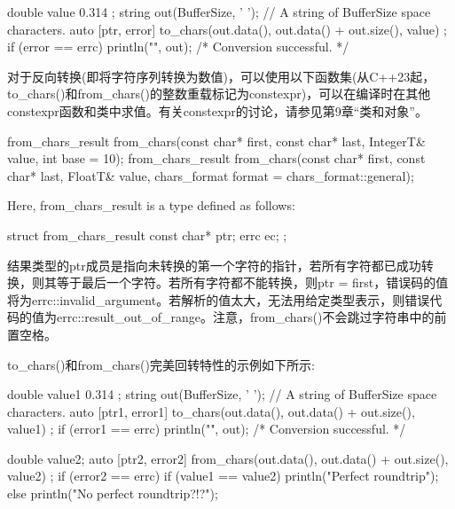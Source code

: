 \begin{cpp}
double value { 0.314 };
string out(BufferSize, ' '); // A string of BufferSize space characters.
auto [ptr, error] { to_chars(out.data(), out.data() + out.size(), value) };
if (error == errc{}) { println("{}", out); /* Conversion successful. */ }
\end{cpp}


对于反向转换(即将字符序列转换为数值)，可以使用以下函数集(从C++23起，to\_chars()和from\_chars()的整数重载标记为constexpr)，可以在编译时在其他constexpr函数和类中求值。有关constexpr的讨论，请参见第9章“类和对象”。

\begin{cpp}
from_chars_result from_chars(const char* first, const char* last, IntegerT& value,
                             int base = 10);
from_chars_result from_chars(const char* first, const char* last, FloatT& value,
                             chars_format format = chars_format::general);
\end{cpp}

Here, from\_chars\_result is a type defined as follows:

\begin{cpp}
struct from_chars_result {
    const char* ptr;
    errc ec;
};
\end{cpp}

结果类型的ptr成员是指向未转换的第一个字符的指针，若所有字符都已成功转换，则其等于最后一个字符。若所有字符都不能转换，则ptr = first，错误码的值将为errc::invalid\_argument。若解析的值太大，无法用给定类型表示，则错误代码的值为errc::result\_out\_of\_range。注意，from\_chars()不会跳过字符串中的前置空格。

to\_chars()和from\_chars()完美回转特性的示例如下所示:

\begin{cpp}
double value1 { 0.314 };
string out(BufferSize, ' '); // A string of BufferSize space characters.
auto [ptr1, error1] { to_chars(out.data(), out.data() + out.size(), value1) };
if (error1 == errc{}) { println("{}", out); /* Conversion successful. */ }

double value2;
auto [ptr2, error2] { from_chars(out.data(), out.data() + out.size(), value2) };
if (error2 == errc{}) {
    if (value1 == value2) {
        println("Perfect roundtrip");
    } else {
        println("No perfect roundtrip?!?");
    }
}
\end{cpp}


